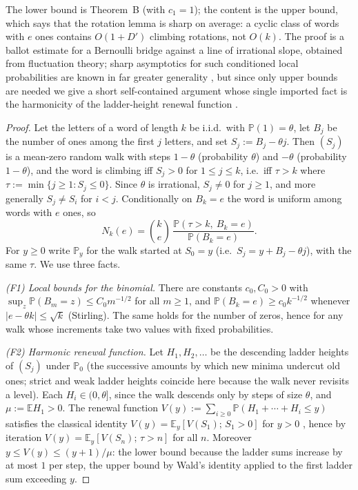 \documentclass[11pt]{article}
\theoremstyle{definition}
\newcommand{\Prob}{\mathbb{P}}
\newcommand{\E}{\mathbb{E}}
\begin{document}
The lower bound is Theorem~B (with $c_1=1$); the content is the upper
bound, which says that the rotation lemma is sharp on average: a cyclic
class of words with $e$ ones contains $O(1+D')$ climbing rotations, not
$O(k)$. The proof is a ballot estimate for a Bernoulli bridge against a
line of irrational slope, obtained from fluctuation theory; sharp
asymptotics for such conditioned local probabilities are known in far
greater generality \cite{Caravenna2005,VatutinWachtel2009}, but since
only upper bounds are needed we give a short self-contained argument
whose single imported fact is the harmonicity of the ladder-height
renewal function \cite{Tanaka1989,BertoinDoney1994}.

\begin{proof}
Let the letters of a word of length $k$ be i.i.d.\ with
$\Prob(1)=\theta$, let $B_j$ be the number of ones among the first $j$
letters, and set $S_j:=B_j-\theta j$. Then $(S_j)$ is a mean-zero random
walk with steps $1-\theta$ (probability $\theta$) and $-\theta$
(probability $1-\theta$), and the word is climbing iff $S_j>0$ for
$1\le j\le k$, i.e.\ iff $\tau>k$ where $\tau:=\min\{j\ge1: S_j\le 0\}$.
Since $\theta$ is irrational, $S_j\ne 0$ for $j\ge1$, and more generally
$S_j\ne S_i$ for $i<j$. Conditionally on $B_k=e$ the word is uniform
among words with $e$ ones, so
\begin{equation}\label{eq:Nke}
N_k(e)=\binom{k}{e}\,\frac{\Prob(\tau>k,\ B_k=e)}{\Prob(B_k=e)} .
\end{equation}
For $y\ge 0$ write $\Prob_y$ for the walk started at $S_0=y$ (i.e.\
$S_j=y+B_j-\theta j$), with the same $\tau$. We use three facts.

\emph{(F1) Local bounds for the binomial.} There are constants
$c_0,C_0>0$ with $\sup_z\Prob(B_m=z)\le C_0m^{-1/2}$ for all $m\ge1$, and
$\Prob(B_k=e)\ge c_0k^{-1/2}$ whenever $|e-\theta k|\le\sqrt k$
(Stirling). The same holds for the number of zeros, hence for any walk
whose increments take two values with fixed probabilities.

\emph{(F2) Harmonic renewal function.} Let $H_1,H_2,\ldots$ be the
descending ladder heights of $(S_j)$ under $\Prob_0$ (the successive
amounts by which new minima undercut old ones; strict and weak ladder
heights coincide here because the walk never revisits a level). Each
$H_i\in(0,\theta]$, since the walk descends only by steps of size
$\theta$, and $\mu:=\E H_1>0$. The renewal function
$V(y):=\sum_{i\ge0}\Prob(H_1+\cdots+H_i\le y)$ satisfies the classical
identity $V(y)=\E_y[V(S_1);\,S_1>0]$ for $y>0$
\cite{Tanaka1989,BertoinDoney1994}, hence by iteration
$V(y)=\E_y[V(S_n);\,\tau>n]$ for all $n$. Moreover $y\le V(y)\le (y+1)/\mu$:
the lower bound because the ladder sums increase by at most $1$ per
step, the upper bound by Wald's identity applied to the first ladder sum
exceeding $y$.


\end{proof}
\end{document}
